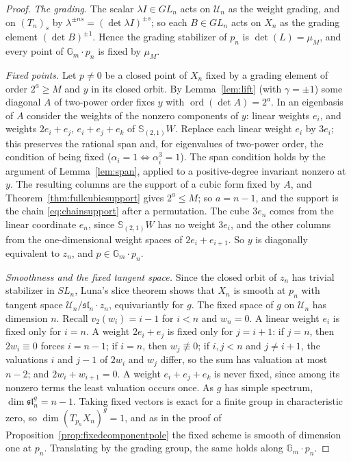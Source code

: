 \documentclass[11pt,a4paper]{article}
\theoremstyle{definition}
\newcommand{\Gm}{\mathbb{G}_m}
\newcommand{\ord}{\operatorname{ord}}
\begin{document}
\begin{proof}
\emph{The grading.} The scalar $\lambda I\in GL_n$ acts on $\mathcal U_n$ as the
weight grading, and on $(T_n)_s$ by $\lambda^{\pm ns}=(\det\lambda I)^{\pm s}$;
so each $B\in GL_n$ acts on $X_n$ as the grading element $(\det B)^{\pm1}$.
Hence the grading stabilizer of $p_n$ is $\det(L)=\mu_M$, and every point of
$\Gm\cdot p_n$ is fixed by $\mu_M$.

\emph{Fixed points.} Let $p\ne0$ be a closed point of $X_n$ fixed by a grading
element of order $2^a\ge M$ and $y$ in its closed orbit. By
Lemma~\ref{lem:lift} (with $\gamma=\pm1$) some diagonal $A$ of two-power order
fixes $y$ with $\ord(\det A)=2^a$. In an eigenbasis of $A$ consider the weights
of the nonzero components of $y$: linear weights $e_i$, and weights $2e_i+e_j$,
$e_i+e_j+e_k$ of $\mathbb S_{(2,1)}W$. Replace each linear weight $e_i$ by
$3e_i$; this preserves the rational span and, for eigenvalues of two-power
order, the condition of being fixed ($\alpha_i=1\iff\alpha_i^3=1$). The span
condition holds by the argument of Lemma~\ref{lem:span}, applied to a
positive-degree invariant nonzero at $y$. The resulting columns are the support
of a cubic form fixed by $A$, and Theorem~\ref{thm:fullcubicsupport} gives
$2^a\le M$; so $a=n-1$, and the support is the chain \eqref{eq:chainsupport}
after a permutation. The cube $3e_n$ comes from the linear coordinate $e_n$,
since $\mathbb S_{(2,1)}W$ has no weight $3e_i$, and the other columns from the
one-dimensional weight spaces of $2e_i+e_{i+1}$. So $y$ is diagonally
equivalent to $z_n$, and $p\in\Gm\cdot p_n$.

\emph{Smoothness and the fixed tangent space.} Since the closed orbit of $z_n$
has trivial stabilizer in $SL_n$, Luna's slice theorem
\cite[Section III.1, Th\'eor\`eme du slice \'etale and Remarque 1$^\circ$, pp.~97--98]{Luna} shows that $X_n$ is smooth at $p_n$ with
tangent space $\mathcal U_n/\mathfrak{sl}_n\cdot z_n$, equivariantly for $g$.
The fixed space of $g$ on $\mathcal U_n$ has dimension $n$. Recall
$v_2(w_i)=i-1$ for $i<n$ and $w_n=0$. A linear weight $e_i$ is fixed only for
$i=n$. A weight $2e_i+e_j$ is fixed only for $j=i+1$: if $j=n$, then
$2w_i\equiv0$ forces $i=n-1$; if $i=n$, then $w_j\not\equiv0$; if $i,j<n$ and
$j\ne i+1$, the valuations $i$ and $j-1$ of $2w_i$ and $w_j$ differ, so the sum
has valuation at most $n-2$; and $2w_i+w_{i+1}=0$. A weight $e_i+e_j+e_k$ is
never fixed, since among its nonzero terms the least valuation occurs once.
As $g$
has simple spectrum, $\dim\mathfrak{sl}_n^g=n-1$. Taking fixed vectors is exact
for a finite group in characteristic zero, so $\dim(T_{p_n}X_n)^g=1$, and as in
the proof of Proposition~\ref{prop:fixedcomponentpole} the fixed scheme is
smooth of dimension one at $p_n$. Translating by the grading group, the same
holds along $\Gm\cdot p_n$.


\end{proof}
\end{document}
